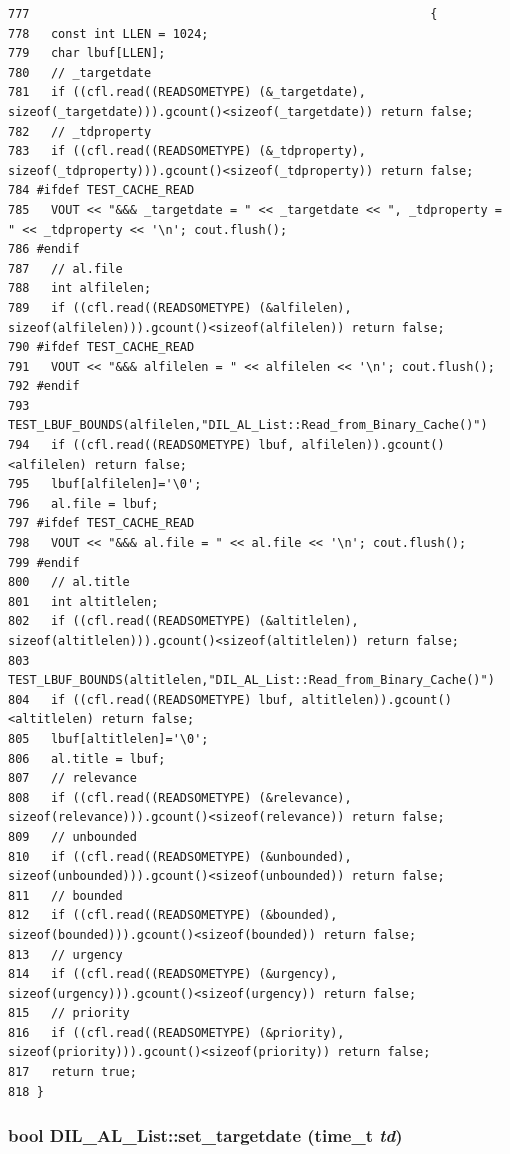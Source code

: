 \footnotesize\begin{verbatim}777                                                        {
778   const int LLEN = 1024;
779   char lbuf[LLEN];
780   // _targetdate
781   if ((cfl.read((READSOMETYPE) (&_targetdate), sizeof(_targetdate))).gcount()<sizeof(_targetdate)) return false;
782   // _tdproperty
783   if ((cfl.read((READSOMETYPE) (&_tdproperty), sizeof(_tdproperty))).gcount()<sizeof(_tdproperty)) return false;
784 #ifdef TEST_CACHE_READ
785   VOUT << "&&& _targetdate = " << _targetdate << ", _tdproperty = " << _tdproperty << '\n'; cout.flush();
786 #endif
787   // al.file
788   int alfilelen;
789   if ((cfl.read((READSOMETYPE) (&alfilelen), sizeof(alfilelen))).gcount()<sizeof(alfilelen)) return false;
790 #ifdef TEST_CACHE_READ
791   VOUT << "&&& alfilelen = " << alfilelen << '\n'; cout.flush();
792 #endif
793   TEST_LBUF_BOUNDS(alfilelen,"DIL_AL_List::Read_from_Binary_Cache()")
794   if ((cfl.read((READSOMETYPE) lbuf, alfilelen)).gcount()<alfilelen) return false;
795   lbuf[alfilelen]='\0';
796   al.file = lbuf;
797 #ifdef TEST_CACHE_READ
798   VOUT << "&&& al.file = " << al.file << '\n'; cout.flush();
799 #endif
800   // al.title
801   int altitlelen;
802   if ((cfl.read((READSOMETYPE) (&altitlelen), sizeof(altitlelen))).gcount()<sizeof(altitlelen)) return false;
803   TEST_LBUF_BOUNDS(altitlelen,"DIL_AL_List::Read_from_Binary_Cache()")
804   if ((cfl.read((READSOMETYPE) lbuf, altitlelen)).gcount()<altitlelen) return false;
805   lbuf[altitlelen]='\0';
806   al.title = lbuf;
807   // relevance
808   if ((cfl.read((READSOMETYPE) (&relevance), sizeof(relevance))).gcount()<sizeof(relevance)) return false;
809   // unbounded
810   if ((cfl.read((READSOMETYPE) (&unbounded), sizeof(unbounded))).gcount()<sizeof(unbounded)) return false;
811   // bounded
812   if ((cfl.read((READSOMETYPE) (&bounded), sizeof(bounded))).gcount()<sizeof(bounded)) return false;
813   // urgency
814   if ((cfl.read((READSOMETYPE) (&urgency), sizeof(urgency))).gcount()<sizeof(urgency)) return false;
815   // priority
816   if ((cfl.read((READSOMETYPE) (&priority), sizeof(priority))).gcount()<sizeof(priority)) return false;
817   return true;
818 }
\end{verbatim}\normalsize 
{}
\subsubsection{\setlength{\rightskip}{0pt plus 5cm}bool DIL\_\-AL\_\-List::set\_\-targetdate (time\_\-t {\em td})\hspace{0.3cm}{\tt  [inline]}}\label{classDIL__AL__List_a7}




